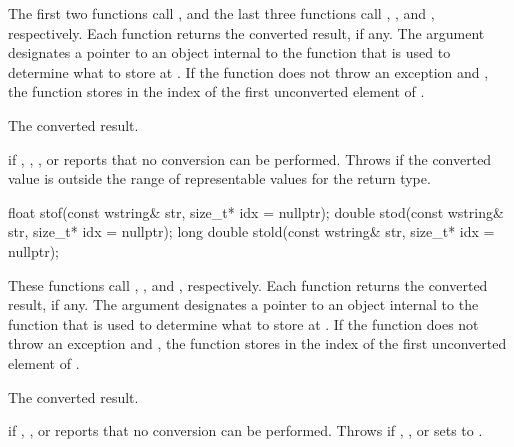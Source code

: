 \begin{itemdescr}
\pnum
\effects
The first two functions call ,
and the last three functions call ,
, and , respectively. Each function returns the converted result, if any. The
argument  designates a pointer to an object internal to the function
that is used to determine what to store at . If the function does
not throw an exception and , the function stores in 
the index of the first unconverted element of .

\pnum
\returns
The converted result.

\pnum
\throws
{} if , , , or
 reports that no conversion can be performed. Throws
 if the converted value is outside the range of representable values
for the return type.
\end{itemdescr}

%
%
%
\begin{itemdecl}
float stof(const wstring& str, size_t* idx = nullptr);
double stod(const wstring& str, size_t* idx = nullptr);
long double stold(const wstring& str, size_t* idx = nullptr);
\end{itemdecl}

\begin{itemdescr}
\pnum
\effects
These functions call ,
, and ,
respectively. Each function returns the converted
result, if any. The argument  designates a pointer to an object internal to
the function that is used to determine what to store at . If the function
does not throw an exception and , the function stores in 
the index of the first unconverted element of .

\pnum
\returns
The converted result.

\pnum
\throws
{} if , , or  reports that no
conversion can be performed. Throws  if , , or
 sets  to .
\end{itemdescr}

